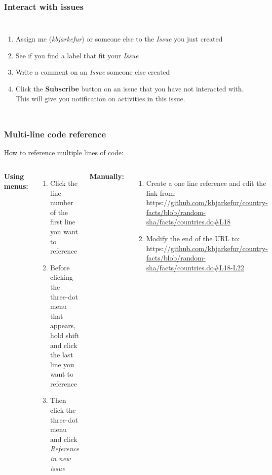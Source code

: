 \documentclass[aspectratio=169]{beamer} %
\newcommand{\trainingURL}[1]{{\color{blue}\url{#1}}}
\newcommand{\traininerUsername}{kbjarkefur}
\newcommand{\repoName}{\traininerUsername/country-facts}
\newcommand{\trainingRepoURL}[1]{\trainingURL{github.com/\repoName #1}}
\begin{document}
\begin{frame}
	\frametitle{Interact with issues}

	\begin{columns}[c]


		\begin{enumerate}
			\item Assign me (\textit{\traininerUsername}) or someone else to the \textit{Issue} you just created
			\item See if you find a label that fit your \textit{Issue}
			\item Write a comment on an \textit{Issue} someone else created
			\item Click the \textbf{Subscribe} button on an issue that you have not interacted with. This will give you notification on activities in this issue.
		\end{enumerate}


	\end{columns}
\end{frame}

\begin{frame}
	\frametitle{Multi-line code reference}

	How to reference multiple lines of code:
	\vspace{.5cm}

	\begin{columns}[T]

		\textbf{Using menus:}
		\begin{enumerate}
			\item Click the line number of the first line you want to reference
			\item Before clicking the three-dot menu that appears, hold shift and click the last line you want to reference
			\item Then click the three-dot menu and click \textit{Reference in new issue}
		\end{enumerate}

		\textbf{Manually:}
		\begin{enumerate}
			\item Create a one line reference and edit the link from: {\color{blue}https://}\trainingRepoURL{/blob/random-sha/facts/countries.do\#L18}
			\item Modify the end of the URL to: {\color{blue}https://}\trainingRepoURL{/blob/random-sha/facts/countries.do\#L18-L22}
		\end{enumerate}
	\end{columns}
\end{frame}
\end{document}
